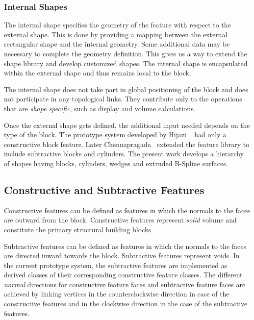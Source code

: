     \subsubsection{Internal Shapes}

    The internal shape specifies the geometry of the feature with respect to
    the external shape. This is done by providing a mapping between the external
	rectangular shape and the internal geometry. Some additional data 
	may be necessary to complete the geometry definition. This gives us a
	way to extend the shape library and develop customized shapes. The internal
	shape is encapsulated within the external shape and thus remains local to 
	the block.


	The internal shape does not take part in global positioning of the
	block and does not participate in any topological links. 
	They contribute only to the operations that are {\em shape specific},
	such as display and volume calculations.


	Once the external shape gets defined, the additional input needed depends 
	on the type of the block. The prototype system developed by Hijazi
	~\cite{Hijazi}
    had only a constructive block feature. Later Chennapragada~\cite{Venky}
    extended the feature library to include subtractive blocks and cylinders. 
    The present work develops a hierarchy of shapes having blocks, cylinders, 
	wedges and extruded B-Spline surfaces.

	\subsection{Constructive and Subtractive Features}

	Constructive features can be defined as features in which the normals
	to the faces are outward from the block. Constructive features represent
	{\em solid} volume and constitute the primary structural building blocks.

	Subtractive features can be defined as features in which the normals
	to the faces are directed inward towards the block. Subtractive features
	represent voids. In the current prototype system,
	the subtractive features are implemented as derived classes of their
	corresponding constructive feature classes. The different {\em normal}
	directions for constructive feature faces and subtractive feature
	faces are achieved by linking vertices in the counterclockwise direction in
	case of the constructive features and in the clockwise direction in the 
	case of the subtractive features.

